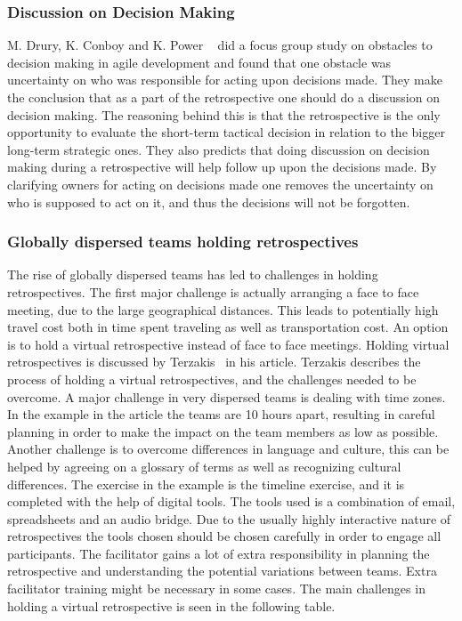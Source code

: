 \documentclass[12pt]{article}
\begin{document}
\subsubsection{Discussion on Decision Making}
M. Drury, K. Conboy and K. Power ~\cite{Drury2012} did a focus group study on obstacles to decision making in agile development and found that one obstacle was uncertainty on who was responsible for acting upon decisions made. They make the conclusion that as a part of the retrospective one should do a discussion on decision making. The reasoning behind this is that the retrospective is the only opportunity to evaluate the short-term tactical decision in relation to the bigger long-term strategic ones. They also predicts that doing discussion on decision making during a retrospective will help follow up upon the decisions made. By clarifying owners for acting on decisions made one removes the uncertainty on who is supposed to act on it, and thus the decisions will not be forgotten. 

\subsubsection{Globally dispersed teams holding retrospectives}
The rise of globally dispersed teams has led to challenges in holding retrospectives. The first major challenge is actually arranging a face to face meeting, due to the large geographical distances. This leads to potentially high travel cost both in time spent traveling as well as transportation cost. An option is to hold a virtual retrospective instead of face to face meetings. Holding virtual retrospectives is discussed by Terzakis~\cite{Terzakis2011} in his article. Terzakis describes the process of holding a virtual retrospectives, and the challenges needed to be overcome. A major challenge in very dispersed teams is dealing with time zones. In the example in the article the teams are 10 hours apart, resulting in careful planning in order to make the impact on the team members as low as possible. Another challenge is to overcome differences in language and culture, this can be helped by agreeing on a glossary of terms as well as recognizing cultural differences. The exercise in the example is the timeline exercise, and it is completed with the help of digital tools. The tools used is a combination of email, spreadsheets and an audio bridge. Due to the usually highly interactive nature of retrospectives the tools chosen should be chosen carefully in order to engage all participants. The facilitator gains a lot of extra responsibility in planning the retrospective and understanding the potential variations between teams. Extra facilitator training might be necessary in some cases. The main challenges in holding a virtual retrospective is seen in the following table.
\end{document}
